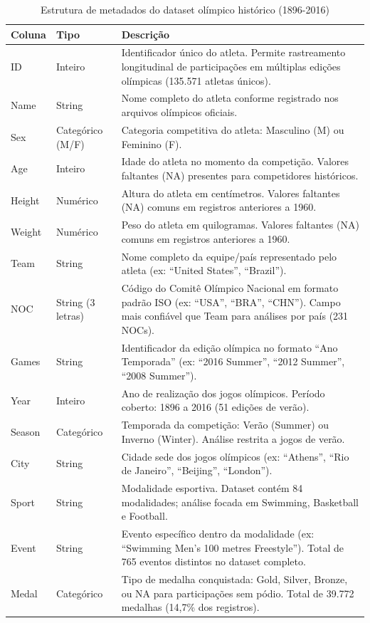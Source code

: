 \begin{table}[htbp]
\centering
\caption{Estrutura de metadados do dataset olímpico histórico (1896-2016)}
\label{tab:dataset_metadata}
\footnotesize
\begin{tabular}{lp{2.5cm}p{8cm}}
\toprule
\textbf{Coluna} & \textbf{Tipo} & \textbf{Descrição} \\
\midrule
ID & Inteiro & Identificador único do atleta. Permite rastreamento longitudinal de participações em múltiplas edições olímpicas (135.571 atletas únicos). \\
\midrule
Name & String & Nome completo do atleta conforme registrado nos arquivos olímpicos oficiais. \\
\midrule
Sex & Categórico (M/F) & Categoria competitiva do atleta: Masculino (M) ou Feminino (F). \\
\midrule
Age & Inteiro & Idade do atleta no momento da competição. Valores faltantes (NA) presentes para competidores históricos. \\
\midrule
Height & Numérico & Altura do atleta em centímetros. Valores faltantes (NA) comuns em registros anteriores a 1960. \\
\midrule
Weight & Numérico & Peso do atleta em quilogramas. Valores faltantes (NA) comuns em registros anteriores a 1960. \\
\midrule
Team & String & Nome completo da equipe/país representado pelo atleta (ex: ``United States'', ``Brazil''). \\
\midrule
NOC & String (3 letras) & Código do Comitê Olímpico Nacional em formato padrão ISO (ex: ``USA'', ``BRA'', ``CHN''). Campo mais confiável que Team para análises por país (231 NOCs). \\
\midrule
Games & String & Identificador da edição olímpica no formato ``Ano Temporada'' (ex: ``2016 Summer'', ``2012 Summer'', ``2008 Summer''). \\
\midrule
Year & Inteiro & Ano de realização dos jogos olímpicos. Período coberto: 1896 a 2016 (51 edições de verão). \\
\midrule
Season & Categórico & Temporada da competição: Verão (Summer) ou Inverno (Winter). Análise restrita a jogos de verão. \\
\midrule
City & String & Cidade sede dos jogos olímpicos (ex: ``Athens'', ``Rio de Janeiro'', ``Beijing'', ``London''). \\
\midrule
Sport & String & Modalidade esportiva. Dataset contém 84 modalidades; análise focada em Swimming, Basketball e Football. \\
\midrule
Event & String & Evento específico dentro da modalidade (ex: ``Swimming Men's 100 metres Freestyle''). Total de 765 eventos distintos no dataset completo. \\
\midrule
Medal & Categórico & Tipo de medalha conquistada: Gold, Silver, Bronze, ou NA para participações sem pódio. Total de 39.772 medalhas (14,7\% dos registros). \\
\bottomrule
\end{tabular}
\end{table}
